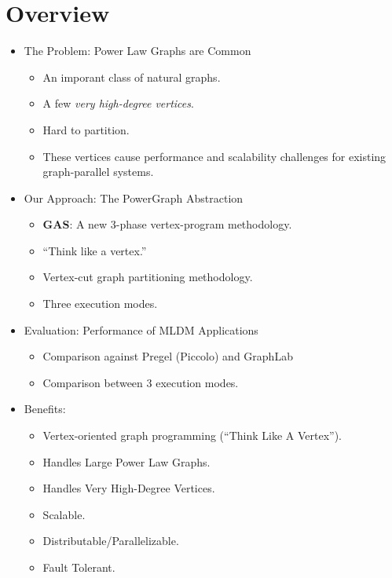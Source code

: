 \section*{Overview}

\begin{frame}
\begin{itemize}
  \item The Problem: Power Law Graphs are Common
  \begin{itemize}
    \item An imporant class of natural graphs.
    \item A few \textit{very high-degree vertices}.
    \item Hard to partition.
    \item These vertices cause performance and scalability challenges for
          existing graph-parallel systems.
  \end{itemize}
\end{itemize}
\end{frame}

\begin{frame}
\begin{itemize}
  \item Our Approach: The PowerGraph Abstraction
  \begin{itemize}
    \item \textbf{GAS}: A new 3-phase vertex-program methodology.
    \item ``Think like a vertex.'' \citep[SIGMOD '10]{malewicz2010pregel}
    \item Vertex-cut graph partitioning methodology.
    \item Three execution modes.
  \end{itemize}

  \item Evaluation: Performance of MLDM Applications
  \begin{itemize}
    \item Comparison against Pregel (Piccolo) and GraphLab
    \item Comparison between 3 execution modes.
  \end{itemize}
\end{itemize}
\end{frame}

\begin{frame}
\begin{itemize}
  \item Benefits:
  \begin{itemize}
    \item Vertex-oriented graph programming (``Think Like A Vertex'').
    \item Handles Large Power Law Graphs.
    \item Handles Very High-Degree Vertices.
    \item Scalable.
    \item Distributable/Parallelizable.
    \item Fault Tolerant.
  \end{itemize}
\end{itemize}
\end{frame}

